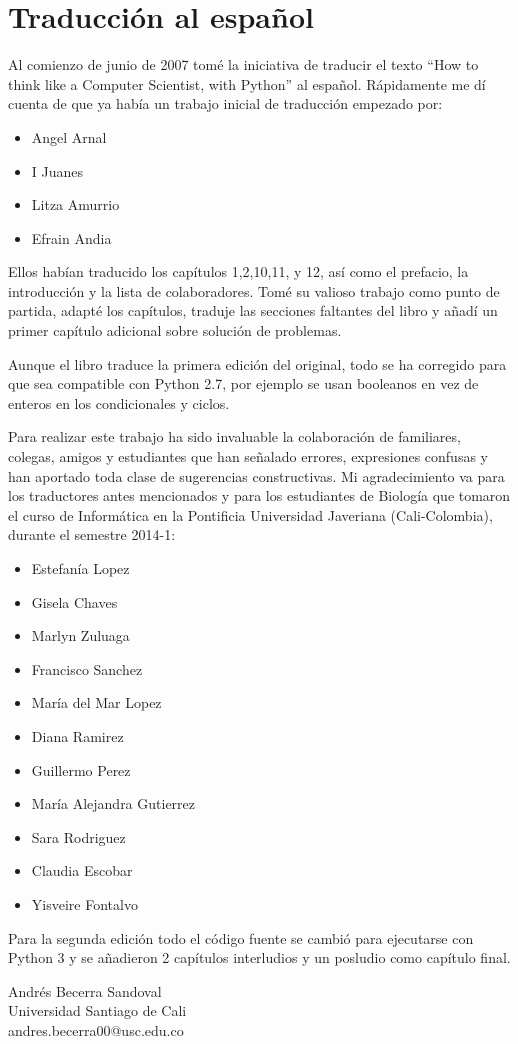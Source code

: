 
\chapter{Traducción al español}

Al comienzo de junio de 2007 tomé la iniciativa de traducir el texto
``How to think like a Computer Scientist, with Python'' al español.
Rápidamente me dí cuenta de que ya había un trabajo inicial de traducción
empezado por:
\begin{itemize}
\item Angel Arnal 
\item I Juanes 
\item Litza Amurrio 
\item Efrain Andia
\end{itemize}
Ellos habían traducido los capítulos 1,2,10,11, y 12, así como el
prefacio, la introducción y la lista de colaboradores. Tomé su valioso
trabajo como punto de partida, adapté los capítulos, traduje las secciones
faltantes del libro y añadí un primer capítulo adicional sobre solución
de problemas.

Aunque el libro traduce la primera edición del original, todo se ha
corregido para que sea compatible con Python 2.7, por ejemplo se usan
booleanos en vez de enteros en los condicionales y ciclos.

Para realizar este trabajo ha sido invaluable la colaboración de familiares,
colegas, amigos y estudiantes que han señalado errores, expresiones
confusas y han aportado toda clase de sugerencias constructivas. Mi
agradecimiento va para los traductores antes mencionados y para los
estudiantes de Biología que tomaron el curso de Informática en la
Pontificia Universidad Javeriana (Cali-Colombia), durante el semestre
2014-1:
\begin{itemize}
\item Estefanía Lopez 
\item Gisela Chaves 
\item Marlyn Zuluaga 
\item Francisco Sanchez 
\item María del Mar Lopez 
\item Diana Ramirez 
\item Guillermo Perez 
\item María Alejandra Gutierrez 
\item Sara Rodriguez 
\item Claudia Escobar
\item Yisveire Fontalvo
\end{itemize}
\vspace{0.25in}
 

Para la segunda edición todo el código fuente se cambió para ejecutarse
con Python 3 y se añadieron 2 capítulos interludios y un posludio
como capítulo final.
\begin{flushleft}
Andrés Becerra Sandoval \\
 Universidad Santiago de Cali \\
 andres.becerra00@usc.edu.co \\
\par\end{flushleft}
